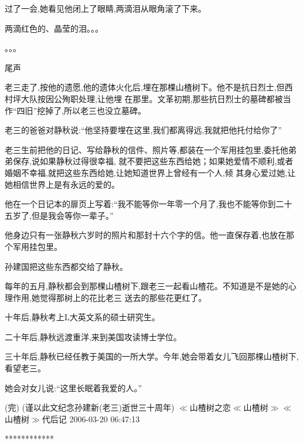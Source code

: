 ﻿\documentclass[12pt]{article}
\begin{document}
过了一会,她看见他闭上了眼睛,两滴泪从眼角滚了下来。



两滴红色的、晶莹的泪。。。



。。。



尾声



老三走了,按他的遗愿,他的遗体火化后,埋在那棵山楂树下。他不是抗日烈士,但西村坪大队按因公殉职处理,让他埋
在那里。文革初期,那些抗日烈士的墓碑都被当作``四旧''挖掉了,所以老三也没立墓碑。



老三的爸爸对静秋说:``他坚持要埋在这里\myrule ,我们都\myrule 离得远,我就把他托付给你了\myrule ''



老三生前把他的日记、写给静秋的信件、照片等,都装在一个军用挂包里,委托他弟弟保存,说如果静秋过得很幸福,
就不要把这些东西给她；如果她爱情不顺利,或者婚姻不幸福,就把这些东西给她,让她知道世界上曾经有一个人,倾
其身心爱过她,让她相信世界上是有永远的爱的。



他在一个日记本的扉页上写着:``我不能等你一年零一个月了,我也不能等你到二十五岁了,但是我会等你一辈子。''



他身边只有一张静秋六岁时的照片和那封十六个字的信。他一直保存着,也放在那个军用挂包里。



孙建国把这些东西都交给了静秋。



每年的五月,静秋都会到那棵山楂树下,跟老三一起看山楂花。不知道是不是她的心理作用,她觉得那树上的花比老三
送去的那些花更红了。



十年后,静秋考上L大英文系的硕士研究生。



二十年后,静秋远渡重洋,来到美国攻读博士学位。



三十年后,静秋已经任教于美国的一所大学。今年,她会带着女儿飞回那棵山楂树下,看望老三。



她会对女儿说:``这里长眠着我爱的人。''



(完) (谨以此文纪念孙建新(老三)逝世三十周年) $\ll$山楂树之恋$\ll$山楂树$\gg$$\ll$山楂树$\gg$代后记
2006-03-20 06:47:13

************
\end{document}
